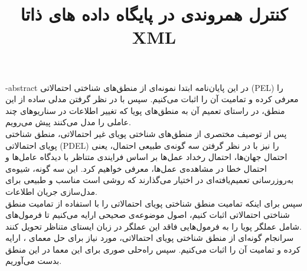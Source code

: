 \subject{علوم‌کامپیوتر }
\title{کنترل همروندی در پایگاه داده های ذاتا XML}
\fa-abstract{\noindent
در این پایان‌نامه ابتدا نمونه‌ای از منطق‌های شناختی احتمالاتی (PEL) را معرفی کرده و تمامیت آن را اثبات می‌کنیم. سپس با در نظر گرفتن مدلی ساده‌ از این منطق، در راستای تعمیم آن به منطق‌های پویا که تغییر اطلاعات در سناریوهای چند عاملی را مدل می‌کنند پیش می‌رویم.
\\
پس از توصیف مختصری از منطق‌های شناختی پویای غیر احتمالاتی، منطق شناختی پویای احتمالاتی (PDEL) را نیز با در نظر گرفتن سه گونه‌ی طبیعی احتمال، یعنی احتمال {\prior} جهان‌ها، احتمال رخداد عمل‌ها بر اساس فرایندی متناظر با دیدگاه عامل‌ها و احتمال خطا در مشاهده‌ی عمل‌ها، معرفی خواهیم کرد. این سه گونه، شیوه‌ی به‌روزرسانی تعمیم‌یافته‌ای در اختیار می‌گذارند که روشی است مناسب و طبیعی برای مدل‌سازی جریان اطلاعات.
\\
سپس برای اینکه تمامیت منطق شناختی پویای احتمالاتی را با استفاده از تمامیت منطق شناختی احتمالاتی اثبات کنیم، اصول موضوعه‌ی صحیحی ارایه می‌کنیم تا فرمول‌های شامل عملگر پویا را به فرمول‌هایی فاقد این عملگر در زبان ایستای متناظر تحویل کنند.
\\
سرانجام گونه‌ای از منطق شناختی پویای احتمالاتی، مورد نیاز برای حل معمای \!\!\! ، ارایه کرده و تمامیت آن را اثبات می‌کنیم. سپس راه‌حلی صوری برای این معما در این منطق بدست می‌آوریم. 
}
\newpage
\thispagestyle{empty}
\vtitle
\newpage
\thispagestyle{empty}
\clearpage
~~~
\newpage
\thispagestyle{empty}

\newpage
\thispagestyle{empty}
\clearpage

